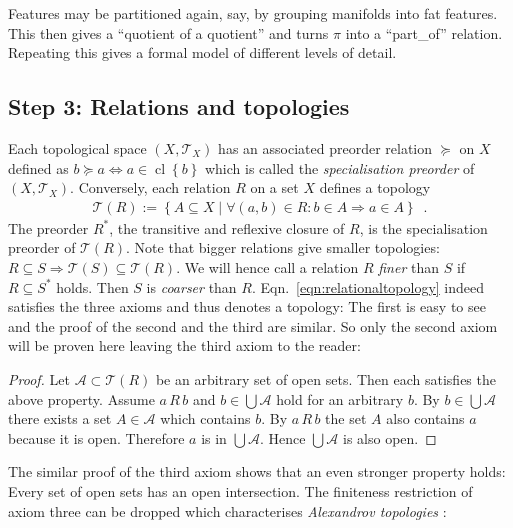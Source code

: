 \documentclass[5p]{elsarticle}
\newcommand{\mathset}[1]{\left\{#1\right\}}
\newcommand{\mathpset}[2]{\left\{#1\mid #2\right\}}
\newcommand{\qq}[1]{``#1''}
\DeclareMathOperator{\closure}{cl}
\begin{document}
Features may be partitioned again, say, by grouping manifolds into fat features. 
This then gives a \qq{quotient of a quotient} and turns $\pi$ into a \qq{part\_of} relation. 
Repeating this gives a formal model of different levels of detail. 


\subsection{Step 3: Relations and topologies}

Each topological space $(X,\mathcal{T}_X)$ has an associated preorder relation 
$\succeq$ on $X$ defined as $b \succeq a \Leftrightarrow a \in \closure\mathset{b}$ which 
is called the \emph{specialisation preorder} of $(X,\mathcal{T}_X)$. 
Conversely, each relation $R$ on a set $X$ defines a topology 
\begin{align}\label{eqn:relationaltopology}
  \mathcal{T}(R) 
    := \mathpset{A \subseteq X}{\forall (a,b)\in R : b\in A \Rightarrow a\in A}\enspace.
\end{align}
The preorder $R^{*}$, the transitive and reflexive closure of $R$, is the specialisation preorder 
of $\mathcal{T}(R)$. 
Note that bigger relations give smaller topologies: 
$R\subseteq S\Rightarrow \mathcal{T}(S)\subseteq \mathcal{T}(R)$. 
We will hence call a relation $R$ \emph{finer} than $S$ if $R\subseteq S^{*}$ holds. 
Then $S$ is \emph{coarser} than $R$.
Eqn.~\ref{eqn:relationaltopology} indeed satisfies the three axioms and thus denotes a topology: 
The first is easy to see and the proof of the second and the third are similar. So only the 
second axiom will be proven here leaving the third axiom to the reader: 

\begin{proof}
Let $\mathcal{A}\subset\mathcal{T}(R)$ be an arbitrary set of open sets. 
Then each satisfies the above property. 
Assume $a\,R\,b$ and $b\in\bigcup\mathcal{A}$ hold for an arbitrary $b$. 
By $b\in\bigcup\mathcal{A}$ there exists a set $A\in\mathcal{A}$ which contains $b$. 
By $a\,R\,b$ the set $A$ also contains $a$ because it is open. 
Therefore $a$ is in $\bigcup\mathcal{A}$. 
Hence $\bigcup\mathcal{A}$ is also open. 
\end{proof}

The similar proof of the third axiom shows that an even stronger property holds: 
Every set of open sets has an open intersection. The finiteness restriction of 
axiom three can be dropped which characterises \emph{Alexandrov topologies} \cite{Alexandroff}:
\end{document}
